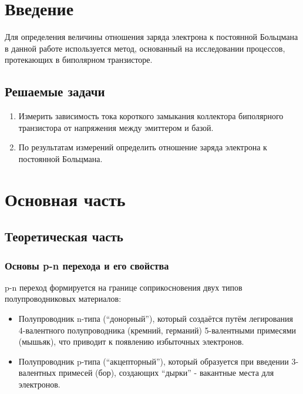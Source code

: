 \section{Введение}

Для определения величины отношения заряда электрона к постоянной Больцмана в данной работе используется метод, основанный на исследовании процессов, протекающих в биполярном транзисторе.

\subsection{Решаемые задачи}

\begin{enumerate}
    \item Измерить зависимость тока короткого замыкания коллектора биполярного транзистора от напряжения между эмиттером и базой.
    \item По результатам измерений определить отношение заряда электрона к постоянной Больцмана.
\end{enumerate}

\section{Основная часть}

\subsection{Теоретическая часть}

\subsubsection{Основы p-n перехода и его свойства}

p-n переход формируется на границе соприкосновения двух типов полупроводниковых материалов:
\begin{itemize}
\item Полупроводник n-типа (``донорный''), который создаётся путём легирования 4-валентного полупроводника (кремний, германий) 5-валентными примесями (мышьяк), что приводит к появлению избыточных электронов.
\item Полупроводник p-типа (``акцепторный''), который образуется при введении 3-валентных примесей (бор), создающих ``дырки'' - вакантные места для электронов.
\end{itemize}


